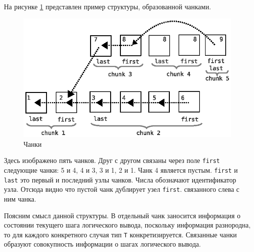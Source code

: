 На рисунке \ref{fig:chank1} представлен пример структуры, образованной чанками.
\begin{figure}[h]
	\centering
	\includegraphics[width=0.6\linewidth]{pics/ChunkFull.eps}
	\caption{Чанки}
	\label{fig:chank1}
\end{figure}
Здесь изображено пять чанков. Друг с другом связаны через поле \texttt{first} следующие чанки: 5 и 4, 4 и 3, 3 и 1, 2 и 1. Чанк 4 является пустым. \texttt{first}  и \texttt{last} это первый и последний узлы чанков. Числа обозначают идентификатор узла. Отсюда видно что пустой чанк дублирует узел \texttt{first}. связанного слева с ним чанка.

Поясним смысл данной структуры. В отдельный чанк заносится информация о состоянии текущего шага логического вывода, поскольку информация разнородна, то для каждого конкретного случая тип {\tt T} конкретизируется. Связанные чанки образуют совокупность информации о шагах логического вывода.



